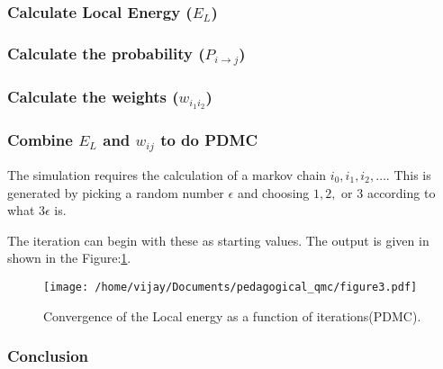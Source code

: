 \documentclass[11pt]{article}
\begin{document}
\subsubsection{Calculate Local Energy (\(E_L\))}
\label{sec:org54a110e}

\subsubsection{Calculate the probability (\(P_{i\rightarrow j}\))}
\label{sec:org0297bd6}

\subsubsection{Calculate the weights (\(w_{i_1 i_2}\))}
\label{sec:org645429b}

\subsubsection{Combine \(E_L\) and \(w_{ij}\) to do PDMC}
\label{sec:orgc01e1db}

The simulation requires the calculation of a markov chain \(i_0, i_1, i_2,
\dots\). This is generated by picking a random number \(\epsilon\) and choosing
\(1, 2,\) or \(3\) according to what \(3 \epsilon\) is.

The iteration can begin with these as starting values. The output is given in
shown in the Figure:\ref{figure3}.

\begin{figure}[htbp]
\centering
\texttt{[image: /home/vijay/Documents/pedagogical\_qmc/figure3.pdf]}
\caption{\label{figure3}Convergence of the Local energy as a function of iterations(PDMC).}
\end{figure}

\subsubsection{Conclusion}
\label{sec:org40fb3bc}
\end{document}
